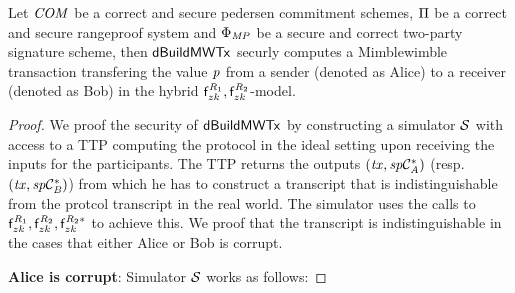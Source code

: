 \begin{theorem}
    Let $\mathit{COM}$ be a correct and secure pedersen commitment schemes, $\Pi$ be a correct and secure rangeproof system and $\Phi_{\mathit{MP}}$ be a secure and correct two-party signature scheme, then $\mathsf{dBuildMWTx}$ securly computes a Mimblewimble transaction transfering the value $\mathit{p}$ from a sender (denoted as Alice) to a receiver (denoted as Bob) in the hybrid $\mathsf{f}^{\mathit{R}_1}_{zk}, \mathsf{f}^{\mathit{R}_2}_{zk}$-model.
\end{theorem}

\begin{proof}
    We proof the security of $\mathsf{dBuildMWTx}$ by constructing a simulator $\mathcal{S}$ with access to a TTP computing the protocol in the ideal setting upon receiving the inputs for the participants.
    The TTP returns the outputs $(\mathit{tx}, \mathit{sp}\mathcal{C}_{\mathit{A}}^*)$ (resp. $(\mathit{tx}, \mathit{sp}\mathcal{C}_{\mathit{B}}^*)$) from which he has to construct a transcript that is indistinguishable from the protcol transcript in the real world. The simulator uses the calls to $\mathsf{f}^{\mathit{R}_1}_{zk}, \mathsf{f}^{\mathit{R}_2}_{zk}, \mathsf{f}^{\mathit{R}_2*}_{zk}$ to achieve this.
    We proof that the transcript is indistinguishable in the cases that either Alice or Bob is corrupt.

    \textbf{Alice is corrupt}: Simulator $\mathcal{S}$ works as follows:
\end{proof}